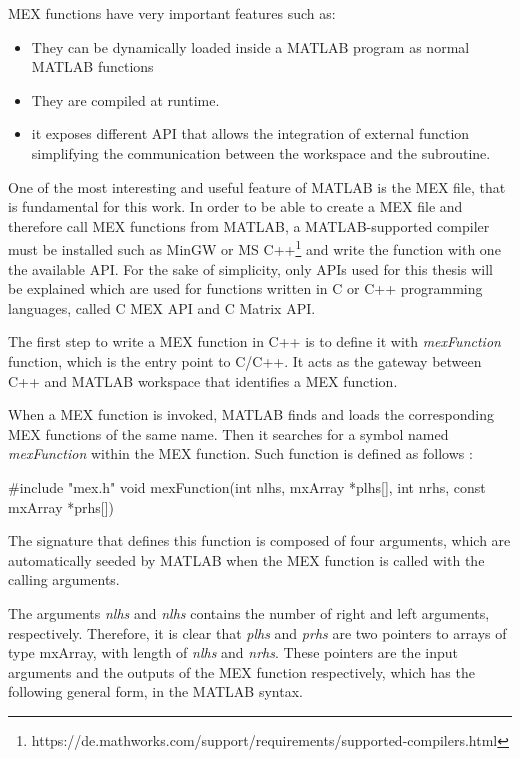 \documentclass[12pt,a4paper]{extarticle}
\begin{document}
MEX functions have very important features such as:
\begin{itemize}
\item They can be dynamically loaded inside a MATLAB program as normal MATLAB functions
\item They are compiled at runtime.
\item it exposes different API that allows the integration of external function simplifying the communication between the workspace and the subroutine.
\end{itemize}

One of the most interesting and useful feature of MATLAB is the MEX file, that is fundamental for this work.
In order to be able to create a MEX file and therefore call MEX functions from MATLAB, a MATLAB-supported compiler must be installed such as MinGW or MS C++\footnote{https://de.mathworks.com/support/requirements/supported-compilers.html} and write the function with one the available API.  For the sake of simplicity, only APIs used for this thesis will be explained which are used for functions written in C or C++ programming languages, called C MEX API and C Matrix API.

The first step to write a MEX function in C++ is to define it with \textit{mexFunction} function, which is the entry point to C/C++. It acts as the gateway between C++ and MATLAB workspace that identifies a MEX function.

When a MEX function is invoked, MATLAB finds and loads the corresponding MEX functions of the same name. Then it searches for a symbol named \textit{mexFunction} within the MEX function. Such function is defined as follows \cite{matlab_mexfunc}:

\begin{cpp}[caption={MEX functions C/C++ entry point definition},label=code:mexfunction]
#include "mex.h"
void mexFunction(int nlhs, mxArray *plhs[], int nrhs, 
	const mxArray *prhs[])
\end{cpp}

The signature that defines this function is composed of four arguments, which are automatically seeded by MATLAB when the MEX function is called with the calling arguments.

The arguments \textit{nlhs} and \textit{nlhs} contains the number of right and left arguments, respectively. Therefore, it is clear that \textit{plhs} and \textit{prhs} are two pointers to arrays of type mxArray, with length of \textit{nlhs} and \textit{nrhs}. These pointers are the input arguments and the outputs of the MEX function respectively, which has the following general form, in the MATLAB syntax.
\end{document}
